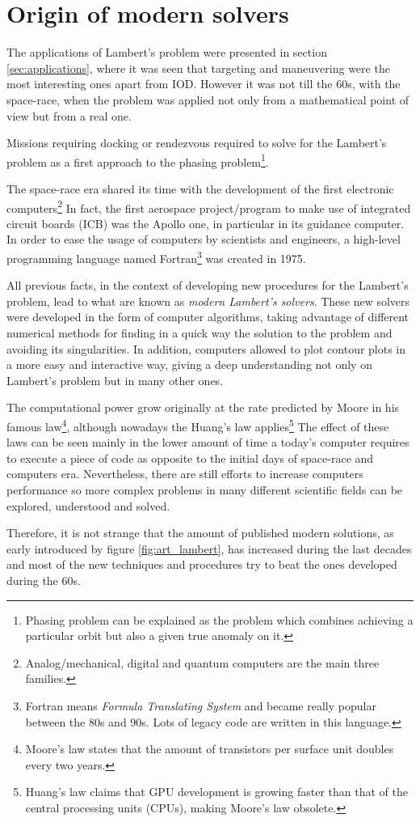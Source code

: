 \section{Origin of modern solvers}

The applications of Lambert's problem were presented in section
\ref{sec:applications}, where it was seen that targeting and maneuvering were
the most interesting ones apart from IOD. However it was not till the 60s, with
the space-race, when the problem was applied not only from a mathematical point
of view but from a real one.

Missions requiring docking or rendezvous required to solve for the Lambert's
problem as a first approach to the phasing problem\footnote{Phasing problem can
be explained as the problem which combines achieving a particular orbit but also
a given true anomaly on it.}.

The space-race era shared its time with the development of the first electronic
computers\footnote{Analog/mechanical, digital and quantum computers are the main
three families.} In fact, the first aerospace project/program to make use of
integrated circuit boards (ICB) was the Apollo one, in particular in its
guidance computer. In order to ease the usage of computers by scientists and
engineers, a high-level programming language named Fortran\footnote{Fortran
means \textit{Formula Translating System} and became really popular
between the 80s and 90s. Lots of legacy code are written in this
language.} was created in 1975.

All previous facts, in the context of developing new procedures for the
Lambert's problem, lead to what are known as \textit{modern Lambert's solvers}.
These new solvers were developed in the form of computer algorithms, taking
advantage of different numerical methods for finding in a quick way the
solution to the problem and avoiding its singularities. In addition, computers
allowed to plot contour plots in a more easy and interactive way, giving a deep
understanding not only on Lambert's problem but in many other ones.

The computational power grow originally at the rate predicted by Moore in his
famous law\footnote{Moore's law states that the amount of transistors per
surface unit doubles every two years.}, although nowadays the Huang's
law applies\footnote{Huang's law claims that GPU development is growing
faster than that of the central processing units (CPUs), making Moore's
law obsolete.} The effect of these laws can be seen mainly in the lower amount
of time a today's computer requires to execute a piece of code as opposite to
the initial days of space-race and computers era. Nevertheless, there are still
efforts to increase computers performance so more complex problems in many
different scientific fields can be explored, understood and solved.

Therefore, it is not strange that the amount of published modern solutions, as
early introduced by figure \ref{fig:art_lambert}, has increased during the last
decades and most of the new techniques and procedures try to beat the ones
developed during the 60s.

